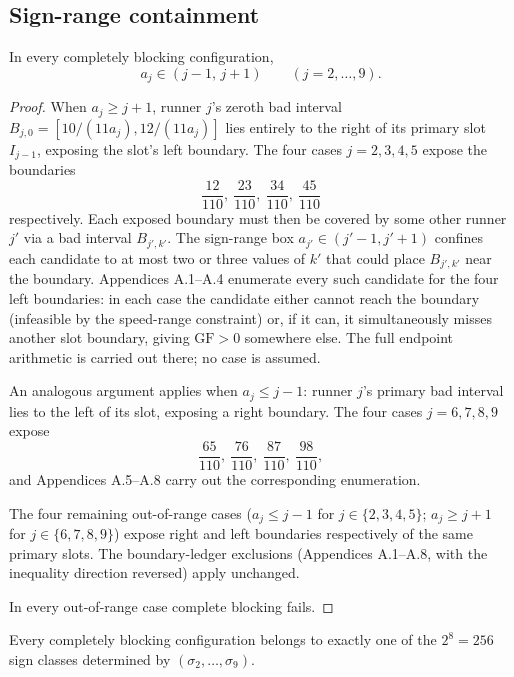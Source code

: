 \documentclass[12pt]{article}
\begin{document}
\subsection{Sign-range containment}

\begin{lemma}\label{l:51}
In every completely blocking configuration,
\[
a_j \in (j-1,\,j+1)\qquad(j=2,\ldots,9).
\]

\end{lemma}
\begin{proof}
When $a_j\ge j+1$, runner $j$'s zeroth bad interval $B_{j,0}=[10/(11a_j),12/(11a_j)]$
lies entirely to the right of its primary slot $I_{j-1}$, exposing the slot's left
boundary. The four cases $j=2,3,4,5$ expose the boundaries
\[
\frac{12}{110},\ \frac{23}{110},\ \frac{34}{110},\ \frac{45}{110}
\]
respectively. Each exposed boundary must then be covered by some other runner $j'$ via a
bad interval $B_{j',k'}$. The sign-range box $a_{j'}\in(j'-1,j'+1)$ confines each
candidate to at most two or three values of $k'$ that could place $B_{j',k'}$ near the
boundary. Appendices A.1–A.4 enumerate every such candidate for the four left boundaries:
in each case the candidate either cannot reach the boundary (infeasible by the speed-range
constraint) or, if it can, it simultaneously misses another slot boundary, giving
$\mathrm{GF}>0$ somewhere else. The full endpoint arithmetic is carried out there; no case
is assumed.

An analogous argument applies when $a_j\le j-1$: runner $j$'s primary bad interval lies
to the left of its slot, exposing a right boundary. The four cases $j=6,7,8,9$ expose
\[
\frac{65}{110},\ \frac{76}{110},\ \frac{87}{110},\ \frac{98}{110},
\]
and Appendices A.5–A.8 carry out the corresponding enumeration.

The four remaining out-of-range cases ($a_j\le j-1$ for $j\in\{2,3,4,5\}$;
$a_j\ge j+1$ for $j\in\{6,7,8,9\}$) expose right and left boundaries respectively
of the same primary slots. The boundary-ledger exclusions (Appendices A.1–A.8, with
the inequality direction reversed) apply unchanged.

In every out-of-range case complete blocking fails.
\end{proof}

\begin{corollary}\label{c:51}
Every completely blocking configuration belongs to exactly one of the
$2^8=256$ sign classes determined by $(\sigma_2,\ldots,\sigma_9)$.
\end{corollary}
\end{document}
